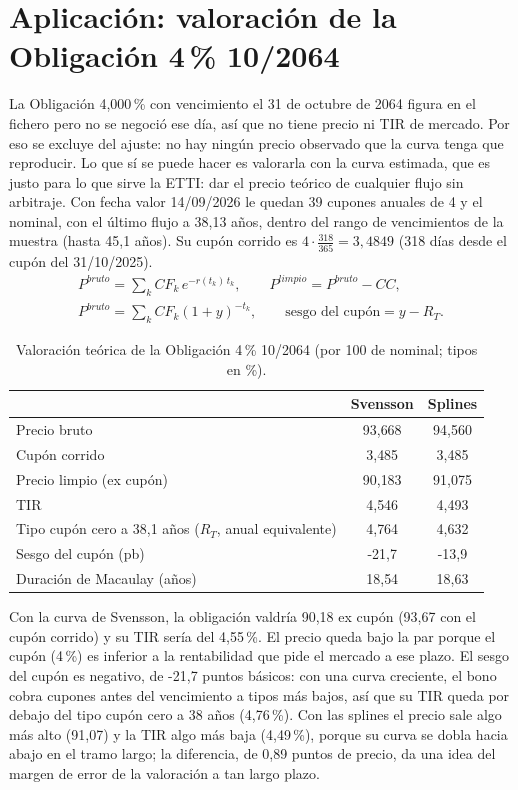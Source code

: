 \documentclass[a4paper,12pt]{article}
\begin{document}
\section{Aplicación: valoración de la Obligación 4\,\% 10/2064}
\label{sec:o64}
La Obligación 4,000\,\% con vencimiento el 31 de octubre de 2064 figura en el fichero pero no se negoció ese día, así que no tiene precio ni TIR de mercado. Por eso se excluye del ajuste: no hay ningún precio observado que la curva tenga que reproducir. Lo que sí se puede hacer es valorarla con la curva estimada, que es justo para lo que sirve la ETTI: dar el precio teórico de cualquier flujo sin arbitraje. Con fecha valor 14/09/2026 le quedan 39 cupones anuales de 4 \texteuro{} y el nominal, con el último flujo a 38{,}13 años, dentro del rango de vencimientos de la muestra (hasta 45,1 años). Su cupón corrido es $4\cdot\frac{318}{365}=3{,}4849$ (318 días desde el cupón del 31/10/2025).
\begin{gather}P^{bruto}=\sum_{k}CF_k\,e^{-r(t_k)\,t_k},\qquad P^{limpio}=P^{bruto}-CC,\\ P^{bruto}=\sum_kCF_k(1+y)^{-t_k},\qquad \text{sesgo del cupón}=y-R_T.\end{gather}
\begin{table}[H]\centering\caption{Valoración teórica de la Obligación 4\,\% 10/2064 (por 100 de nominal; tipos en \%).}\label{tab:o64}
\begin{tabular}{lcc}\toprule & Svensson & Splines\\\midrule
Precio bruto & 93{,}668 & 94{,}560 \\
Cupón corrido & 3{,}485 & 3{,}485 \\
Precio limpio (ex cupón) & 90{,}183 & 91{,}075 \\
TIR & 4{,}546 & 4{,}493 \\
Tipo cupón cero a 38{,}1 años ($R_T$, anual equivalente) & 4{,}764 & 4{,}632 \\
Sesgo del cupón (pb) & -21{,}7 & -13{,}9 \\
Duración de Macaulay (años) & 18{,}54 & 18{,}63 \\
\bottomrule\end{tabular}\end{table}
Con la curva de Svensson, la obligación valdría 90{,}18 ex cupón (93{,}67 con el cupón corrido) y su TIR sería del 4{,}55\,\%. El precio queda bajo la par porque el cupón (4\,\%) es inferior a la rentabilidad que pide el mercado a ese plazo. El sesgo del cupón es negativo, de -21{,}7 puntos básicos: con una curva creciente, el bono cobra cupones antes del vencimiento a tipos más bajos, así que su TIR queda por debajo del tipo cupón cero a 38 años (4{,}76\,\%). Con las splines el precio sale algo más alto (91{,}07) y la TIR algo más baja (4{,}49\,\%), porque su curva se dobla hacia abajo en el tramo largo; la diferencia, de 0{,}89 puntos de precio, da una idea del margen de error de la valoración a tan largo plazo.
\end{document}
